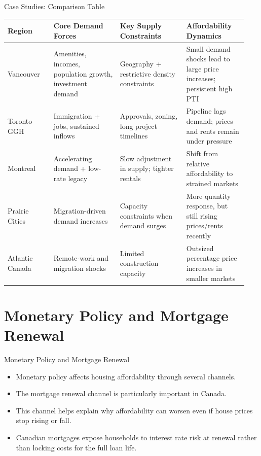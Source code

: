 \documentclass[aspectratio=169]{beamer}
\begin{document}
\begin{frame}{Case Studies: Comparison Table}
\transfade
\begin{center}
\scriptsize
\setlength{\tabcolsep}{3pt}
\renewcommand{\arraystretch}{1.2}
\begin{tabular}{p{0.18\linewidth} p{0.26\linewidth} p{0.26\linewidth} p{0.24\linewidth}}
\toprule
\textbf{Region} & \textbf{Core Demand Forces} & \textbf{Key Supply Constraints} & \textbf{Affordability Dynamics} \\
\midrule
Vancouver & Amenities, incomes, population growth, investment demand & Geography + restrictive density constraints & Small demand shocks lead to large price increases; persistent high PTI \\
\addlinespace[0.35em]
Toronto GGH & Immigration + jobs, sustained inflows & Approvals, zoning, long project timelines & Pipeline lags demand; prices and rents remain under pressure \\
\addlinespace[0.35em]
Montreal & Accelerating demand + low-rate legacy & Slow adjustment in supply; tighter rentals & Shift from relative affordability to strained markets \\
\addlinespace[0.35em]
Prairie Cities & Migration-driven demand increases & Capacity constraints when demand surges & More quantity response, but still rising prices/rents recently \\
\addlinespace[0.35em]
Atlantic Canada & Remote-work and migration shocks & Limited construction capacity & Outsized percentage price increases in smaller markets \\
\bottomrule
\end{tabular}
\end{center}
\end{frame}

\section{Monetary Policy and Mortgage Renewal}

\begin{frame}{Monetary Policy and Mortgage Renewal}
\transfade
\begin{itemize}[<+->]
  \item Monetary policy affects housing affordability through several channels.
  \item The mortgage renewal channel is particularly important in Canada.
  \item This channel helps explain why affordability can worsen even if house prices stop rising or fall.
  \item Canadian mortgages expose households to interest rate risk at renewal rather than locking costs for the full loan life.
\end{itemize}
\end{frame}
\end{document}
